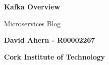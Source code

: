 \begin{titlepage}
    \begin{center}
    	
        \vspace*{1cm}
        
        \textbf{Kafka Overview}
        
        \vspace{0.5cm}
        Microservices Blog
        
        \vspace{1.5cm}
        
        \textbf{David Ahern - R00002267}
        
        \vspace{0.5cm}
        \textbf{Cork Institute of Technology}
        
    \end{center}
\end{titlepage}